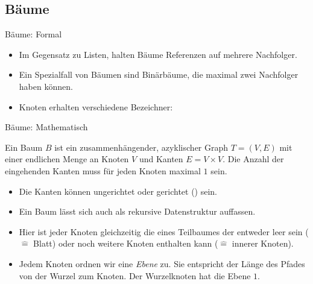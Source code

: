\subsection{Bäume}
\begin{frame}{Bäume: Formal}
    \begin{itemize}[<+(1)->]
        \widei
        \item Im Gegensatz zu Listen, halten Bäume Referenzen auf mehrere Nachfolger.
        \item Ein Spezialfall von Bäumen sind Binärbäume, die maximal zwei Nachfolger haben können.
        \item Knoten erhalten verschiedene Bezeichner: 
    \end{itemize}
\end{frame}

\begin{frame}{Bäume: Mathematisch}
    \begin{definition}[Baum]
Ein Baum \(B\) ist ein zusammenhängender, azyklischer Graph \(T = (V,E)\) mit einer endlichen Menge an Knoten \(V\) und Kanten \(E = V \times V\).\pause{} Die Anzahl der eingehenden Kanten muss für jeden Knoten maximal \(1\) sein.
    \end{definition}
    \begin{itemize}[<+(1)->]
        \item Die Kanten können ungerichtet oder gerichtet () sein.
        \item Ein Baum lässt sich auch als rekursive Datenstruktur auffassen.
        \item Hier ist jeder Knoten gleichzeitig die  eines Teilbaumes\pause{} der entweder leer sein (\(\widehat{=}\) Blatt)\pause{} oder noch weitere Knoten enthalten kann (\(\widehat{=}\) innerer Knoten).
        \item Jedem Knoten ordnen wir eine \emph{Ebene} zu. \pause{}Sie entspricht der Länge des Pfades von der Wurzel zum Knoten.\pause{} Der Wurzelknoten hat die Ebene \(1\).
    \end{itemize}
\end{frame}


